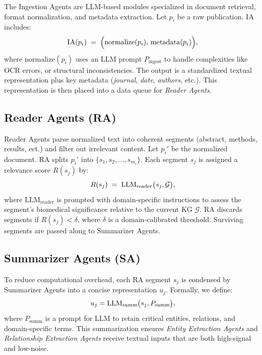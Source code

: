 \documentclass{article}
\begin{document}
The Ingestion Agents are LLM-based modules specialized in document retrieval, format normalization, and metadata extraction. Let $p_i$ be a raw publication. IA includes:
\begin{equation}
\fontsize{9pt}{9pt}\selectfont
\mathrm{IA}(p_i) 
\;=\; 
\Bigl(\mathrm{normalize}(p_i),\, \mathrm{metadata}(p_i)\Bigr),
\end{equation}
where $\mathrm{normalize}(p_i)$ uses an LLM prompt $P_{\mathrm{ingest}}$ to handle complexities like OCR errors, or structural inconsistencies. The output is a standardized textual representation plus key metadata (\textit{journal}, \textit{date}, \textit{authors}, etc.). This representation is then placed into a data queue for \emph{Reader Agents}.

\subsection{Reader Agents (RA)}

Reader Agents parse normalized text into coherent segments (abstract, methods, results, ect.) and filter out irrelevant content. Let $p_i'$ be the normalized document. RA splits $p_i'$ into $\{s_1, s_2, \ldots, s_{m_i}\}$. Each segment $s_j$ is assigned a relevance score $R(s_j)$ by:
\begin{equation}
\fontsize{9pt}{5pt}\selectfont
R(s_j) \;=\; \mathrm{LLM}_{\mathrm{reader}}\bigl(s_j, \mathcal{G} \bigr),
\label{eq:ra_scoring}
\end{equation}
where $\mathrm{LLM}_{\mathrm{reader}}$ is prompted with domain-specific instructions to assess the segment’s biomedical significance relative to the current KG $\mathcal{G}$. RA discards segments if $R(s_j) < \delta$, where $\delta$ is a domain-calibrated threshold. Surviving segments are passed along to Summarizer Agents.


\subsection{Summarizer Agents (SA)}

To reduce computational overhead, each RA segment $s_j$ is condensed by Summarizer Agents into a concise representation $u_j$. Formally, we define:
\begin{equation}
\fontsize{9pt}{5pt}\selectfont
u_j 
= \mathrm{LLM}_{\mathrm{summ}}\bigl(s_j, P_{\mathrm{summ}}\bigr),
\end{equation}
where $P_{\mathrm{summ}}$ is a prompt for LLM to retain critical entities, relations, and domain-specific terms. This summarization ensures \emph{Entity Extraction Agents} and \emph{Relationship Extraction Agents} receive textual inputs that are both high-signal and low-noise.
\end{document}
